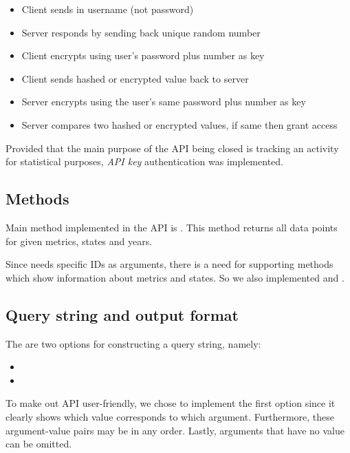 				\begin{itemize}
					\item
						Client sends in username (not password)
					\item
						Server responds by sending back unique random number
					\item
						Client encrypts using user's password plus number as key
					\item
						Client sends hashed or encrypted value back to server
					\item
						Server encrypts using the user's same password plus number as key
					\item
						Server compares two hashed or encrypted values, if same then grant access
				\end{itemize}
				
				Provided that the main purpose of the API being closed is tracking an activity 
				for statistical purposes, \emph{API key} authentication was implemented.

			\subsection{Methods}
				
				Main method implemented in the API is . 
				This method returns all data points for given metrics, states and years.
				
				Since  needs specific IDs as arguments, there is a need for supporting 
				methods which show information about metrics and states. 
				So we also implemented  and .

			\subsection{Query string and output format}
			
				The are two options for constructing a query string, namely:
				\begin{itemize}
					\item
					\item
				\end{itemize}
				
				To make out API user-friendly, we chose to implement the first option since it clearly 
				shows which value corresponds to which argument. Furthermore, these argument-value pairs may be in any order. 
				Lastly, arguments that have no value can be omitted.
				
